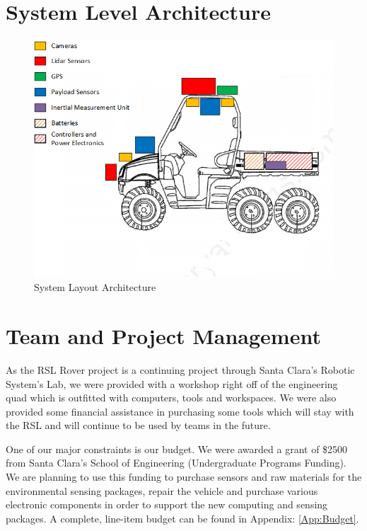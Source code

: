 %
\section{System Level Architecture}

\begin{figure}[H]
\centering
\includegraphics[width=.8\linewidth]{SensorLayout}
\caption{System Layout Architecture}
\label{fig:systemlayout}
\end{figure}
%
\section{Team and Project Management}

As the RSL Rover project is a continuing project through Santa Clara's Robotic System's Lab, we were provided with a workshop right off of the engineering quad which is outfitted with computers, tools and workspaces. We were also provided some financial assistance in purchasing some tools which will stay with the RSL and will continue to be used by teams in the future. 

One of our major constraints is our budget. We were awarded a grant of \$2500 from Santa Clara's School of Engineering (Undergraduate Programs Funding). We are planning to use this funding to purchase sensors and raw materials for the environmental sensing packages, repair the vehicle and purchase various electronic components in order to support the new computing and sensing packages. A complete, line-item budget can be found in Appendix: \ref{App:Budget}. 

